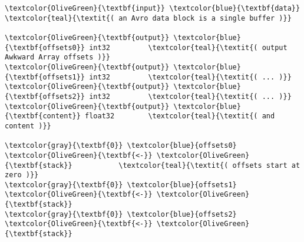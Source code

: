 \documentclass{webofc}
\begin{document}
\begin{Verbatim}[commandchars=\\\{\}]
\textcolor{OliveGreen}{\textbf{input}} \textcolor{blue}{\textbf{data}}                  \textcolor{teal}{\textit{( an Avro data block is a single buffer )}}

\textcolor{OliveGreen}{\textbf{output}} \textcolor{blue}{\textbf{offsets0}} int32         \textcolor{teal}{\textit{( output Awkward Array offsets )}}
\textcolor{OliveGreen}{\textbf{output}} \textcolor{blue}{\textbf{offsets1}} int32         \textcolor{teal}{\textit{( ... )}}
\textcolor{OliveGreen}{\textbf{output}} \textcolor{blue}{\textbf{offsets2}} int32         \textcolor{teal}{\textit{( ... )}}
\textcolor{OliveGreen}{\textbf{output}} \textcolor{blue}{\textbf{content}} float32        \textcolor{teal}{\textit{( and content )}}

\textcolor{gray}{\textbf{0}} \textcolor{blue}{offsets0} \textcolor{OliveGreen}{\textbf{<-}} \textcolor{OliveGreen}{\textbf{stack}}           \textcolor{teal}{\textit{( offsets start at zero )}}
\textcolor{gray}{\textbf{0}} \textcolor{blue}{offsets1} \textcolor{OliveGreen}{\textbf{<-}} \textcolor{OliveGreen}{\textbf{stack}}
\textcolor{gray}{\textbf{0}} \textcolor{blue}{offsets2} \textcolor{OliveGreen}{\textbf{<-}} \textcolor{OliveGreen}{\textbf{stack}}


\end{Verbatim}
\end{document}
